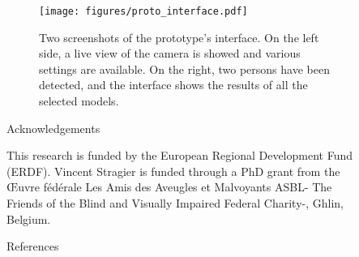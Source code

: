 \documentclass[final]{beamer}
\newlength{\sepwidth}
\newlength{\colwidth}
\newcommand{\separatorcolumn}{\begin{column}{\sepwidth}\end{column}}
\begin{document}
\begin{frame}[t]
\begin{columns}[t]
\begin{column}{\colwidth}
    \end{column}

    \separatorcolumn

    \begin{column}{\colwidth}


      \begin{exampleblock}{}
        \begin{figure}[!ht]
          \centering
          \texttt{[image: figures/proto\_interface.pdf]}
          \caption{Two screenshots of the prototype's interface. On the left side, a live view of the camera is showed and various settings are available. On the right, two persons have been detected, and the interface shows the results of all the selected models.\label{fig:facial_recognition_interface}}
        \end{figure}
      \end{exampleblock}

      \begin{block}{Acknowledgements}

        \footnotesize{This research is funded by the European Regional Development Fund (ERDF). Vincent Stragier is funded through a PhD grant from the Œuvre fédérale Les Amis des Aveugles et Malvoyants ASBL- The Friends of the Blind and Visually Impaired Federal Charity-, Ghlin, Belgium.}

      \end{block}

      \begin{block}{References}

        \footnotesize{}

      \end{block}

    \end{column}

    \separatorcolumn
  \end{columns}
\end{frame}
\end{document}
